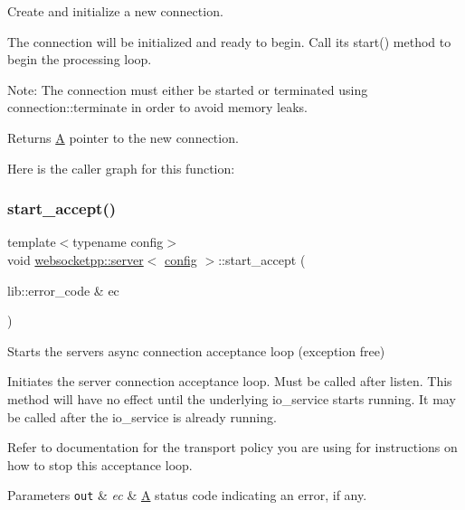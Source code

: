 Create and initialize a new connection. 

The connection will be initialized and ready to begin. Call its start() method to begin the processing loop.

Note\+: The connection must either be started or terminated using connection\+::terminate in order to avoid memory leaks.

\begin{DoxyReturn}{Returns}
\mbox{\hyperlink{struct_a}{A}} pointer to the new connection. 
\end{DoxyReturn}
Here is the caller graph for this function\+:
\mbox{\label{classwebsocketpp_1_1server_a0204a7d444144f7ea5b8bbcf14689fc1}} 
\subsubsection{\texorpdfstring{start\+\_\+accept()}{start\_accept()}\hspace{0.1cm}{\footnotesize\ttfamily [1/2]}}
{\footnotesize\ttfamily template$<$typename config$>$ \\
void \mbox{\hyperlink{classwebsocketpp_1_1server}{websocketpp\+::server}}$<$ \mbox{\hyperlink{classconfig}{config}} $>$\+::start\+\_\+accept (\begin{DoxyParamCaption}\item[{lib\+::error\+\_\+code \&}]{ec }\end{DoxyParamCaption})\hspace{0.3cm}{\ttfamily [inline]}}



Starts the server\textquotesingle{}s async connection acceptance loop (exception free) 

Initiates the server connection acceptance loop. Must be called after listen. This method will have no effect until the underlying io\+\_\+service starts running. It may be called after the io\+\_\+service is already running.

Refer to documentation for the transport policy you are using for instructions on how to stop this acceptance loop.


\begin{DoxyParams}[1]{Parameters}
\mbox{\tt out}  & {\em ec} & \mbox{\hyperlink{struct_a}{A}} status code indicating an error, if any. \\
\hline
\end{DoxyParams}
\mbox{\label{classwebsocketpp_1_1server_ab61bcdf9fd532fe7ebd934f8d84fdfea}} 
